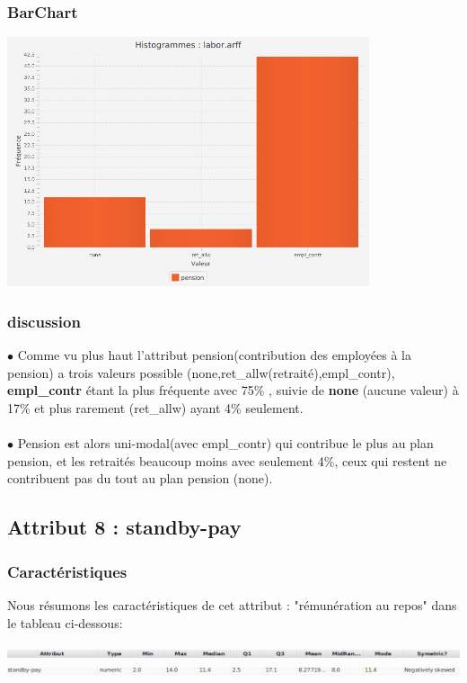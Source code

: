 \documentclass[12pt,a4paper,oneside]{book}
\begin{document}
	\subsubsection{BarChart}
	\begin{center}
		\includegraphics[width=0.8\textwidth]{screens/barchart/pension-barchart.png}%
		\label{labelname}%
	\end{center}
	\subsubsection{discussion}
	$\bullet$ Comme vu plus haut l'attribut pension(contribution des employées à la pension) a trois valeurs possible (none,ret\_allw(retraité),empl\_contr), \textbf{empl\_contr} étant la plus fréquente avec  75\% , suivie de \textbf{none} (aucune valeur)
	à 17\% et plus rarement (ret\_allw) ayant 4\% seulement.\\
	\textbf{ }\\
	$\bullet$ Pension est alors uni-modal(avec empl\_contr) qui contribue le plus  au plan pension, et les retraités beaucoup moins avec seulement 4\%, ceux qui restent ne contribuent pas du tout au plan pension (none).
	
	\newpage
	
	\subsection{Attribut 8 : standby-pay }
	\subsubsection{Caractéristiques}
	Nous résumons les caractéristiques de cet attribut : "rémunération au repos" dans le tableau ci-dessous:
	\begin{center}
		\includegraphics[width=1\textwidth]{screens/att.png}\\ \includegraphics[width=1\textwidth]{screens/att-8.png}%
		\label{labelname}%
	\end{center}
	
\end{document}
